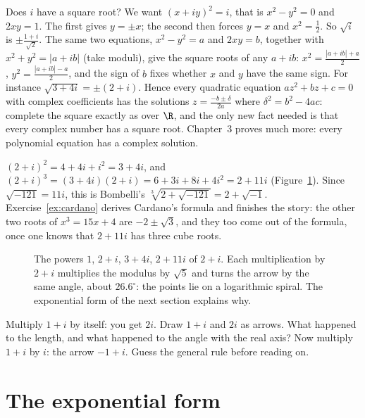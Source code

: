 \begin{examplex}
Does $i$ have a square root? We want $(x+iy)^2=i$, that is $x^2-y^2=0$ and $2xy=1$. The first gives $y=\pm x$; the second then forces $y=x$ and
$x^2=\frac12$. So $\sqrt i$ is $\pm\frac{1+i}{\sqrt2}$. The same two equations, $x^2-y^2=a$ and $2xy=b$, together with $x^2+y^2=|a+ib|$ (take moduli),
give the square roots of any $a+ib$: $x^2=\frac{|a+ib|+a}2$, $y^2=\frac{|a+ib|-a}2$, and the sign of $b$ fixes whether $x$ and $y$ have the same sign.
For instance $\sqrt{3+4i}=\pm(2+i)$. Hence every quadratic equation $az^2+bz+c=0$ with complex coefficients has the solutions
$z=\frac{-b\pm\delta}{2a}$ where $\delta^2=b^2-4ac$: complete the square exactly as over $\R$, and the only new fact needed is that every complex
number has a square root. Chapter~3 proves much more: every polynomial equation has a complex solution.
\end{examplex}

\begin{examplex}
$(2+i)^2=4+4i+i^2=3+4i$, and $(2+i)^3=(3+4i)(2+i)=6+3i+8i+4i^2=2+11i$ (Figure~\ref{fig:bombelli}). Since $\sqrt{-121}=11i$, this is Bombelli's
$\sqrt[3]{2+\sqrt{-121}}=2+\sqrt{-1}$. Exercise~\ref{ex:cardano} derives Cardano's formula and finishes the story: the other two roots of
$x^3=15x+4$ are $-2\pm\sqrt3$, and they too come out of the formula, once one knows that $2+11i$ has three cube roots.
\end{examplex}

\begin{figure}[ht]
\centering
{}
\caption{The powers $1$, $2+i$, $3+4i$, $2+11i$ of $2+i$. Each multiplication by $2+i$ multiplies the modulus by $\sqrt5$ and turns the arrow by the same angle, about $26.6^\circ$: the points lie on a logarithmic spiral. The exponential form of the next section explains why.}
\label{fig:bombelli}
\end{figure}

\begin{think}
Multiply $1+i$ by itself: you get $2i$. Draw $1+i$ and $2i$ as arrows. What happened to the length, and what happened to the angle with the real axis? Now multiply $1+i$ by $i$: the arrow $-1+i$. Guess the general rule before reading on.
\end{think}

\section{The exponential form}

